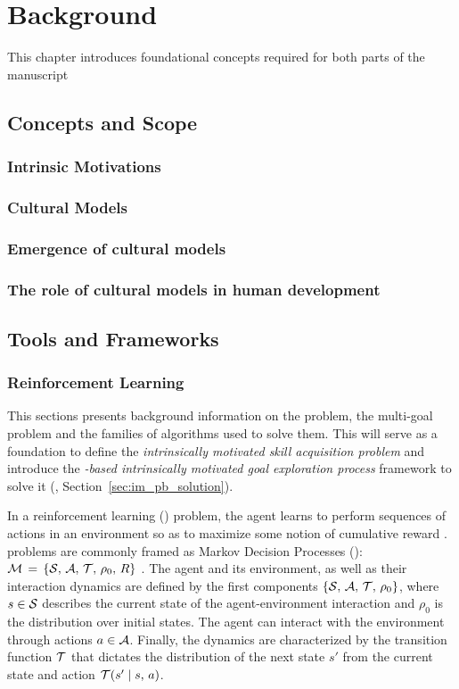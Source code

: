 \chapter{Background}
\adjustmtc
\minitoc

This chapter introduces foundational concepts required for both parts of the manuscript

\section{Concepts and Scope}
\subsection{Intrinsic Motivations}
\subsection{Cultural Models}
\subsection{Emergence of cultural models}
\subsection{The role of cultural models in human development}

\section{Tools and Frameworks}
\subsection{Reinforcement Learning}

\label{sec:background}
This sections presents background information on the \rl problem, the multi-goal \rl problem and the families of algorithms used to solve them. This will serve as a foundation to define the \textit{intrinsically motivated skill acquisition problem} and introduce the  \textit{\textsl{\rl}-based intrinsically motivated goal exploration process} framework to solve it (\rlimgep, Section~\ref{sec:im_pb_solution}).

In a reinforcement learning (\rl) problem, the agent learns to perform sequences of actions in an environment so as to maximize some notion of cumulative reward \cite{sutton2018reinforcement}. \rl problems are commonly framed as Markov Decision Processes (\mdps): $\mathcal{M}\,=\,\{\mathcal{S},\,\mathcal{A},\,\mathcal{T},\,\rho_0,\,R\}$ \cite{sutton2018reinforcement}. The agent and its environment, as well as their interaction dynamics are defined by the first components $\{\mathcal{S},\,\mathcal{A},\,\mathcal{T},\,\rho_0\}$, where $s\in\mathcal{S}$ describes the current state of the agent-environment interaction and $\rho_0$ is the distribution over initial states. The agent can interact with the environment through actions $a\in\mathcal{A}$. Finally, the dynamics are characterized by the transition function $\mathcal{T}$ that dictates the distribution of the next state $s'$ from the current state and action $\mathcal{T} (s'\mid s,\,a)$. 

